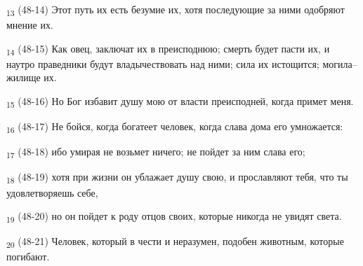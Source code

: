 \begin{tcolorbox}
\textsubscript{13} (48-14) Этот путь их есть безумие их, хотя последующие за ними одобряют мнение их.
\end{tcolorbox}
\begin{tcolorbox}
\textsubscript{14} (48-15) Как овец, заключат их в преисподнюю; смерть будет пасти их, и наутро праведники будут владычествовать над ними; сила их истощится; могила--жилище их.
\end{tcolorbox}
\begin{tcolorbox}
\textsubscript{15} (48-16) Но Бог избавит душу мою от власти преисподней, когда примет меня.
\end{tcolorbox}
\begin{tcolorbox}
\textsubscript{16} (48-17) Не бойся, когда богатеет человек, когда слава дома его умножается:
\end{tcolorbox}
\begin{tcolorbox}
\textsubscript{17} (48-18) ибо умирая не возьмет ничего; не пойдет за ним слава его;
\end{tcolorbox}
\begin{tcolorbox}
\textsubscript{18} (48-19) хотя при жизни он ублажает душу свою, и прославляют тебя, что ты удовлетворяешь себе,
\end{tcolorbox}
\begin{tcolorbox}
\textsubscript{19} (48-20) но он пойдет к роду отцов своих, которые никогда не увидят света.
\end{tcolorbox}
\begin{tcolorbox}
\textsubscript{20} (48-21) Человек, который в чести и неразумен, подобен животным, которые погибают.
\end{tcolorbox}
